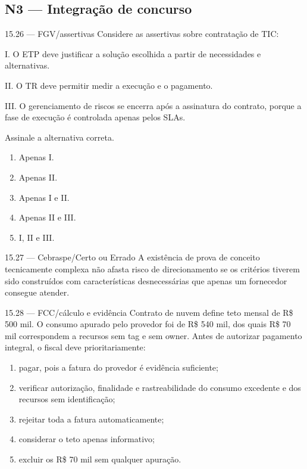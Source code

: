 \subsection*{N3 — Integração de concurso}

\begin{questao}{ 15.26 — FGV/assertivas}
Considere as assertivas sobre contratação de TIC:

I. O ETP deve justificar a solução escolhida a partir de necessidades e alternativas.

II. O TR deve permitir medir a execução e o pagamento.

III. O gerenciamento de riscos se encerra após a assinatura do contrato, porque a fase de execução é controlada apenas pelos SLAs.

Assinale a alternativa correta.
\begin{enumerate}[label=\Alph*)]
\item Apenas I.
\item Apenas II.
\item Apenas I e II.
\item Apenas II e III.
\item I, II e III.
\end{enumerate}
\end{questao}

\begin{questao}{ 15.27 — Cebraspe/Certo ou Errado}
A existência de prova de conceito tecnicamente complexa não afasta risco de direcionamento se os critérios tiverem sido construídos com características desnecessárias que apenas um fornecedor consegue atender.
\end{questao}

\begin{questao}{ 15.28 — FCC/cálculo e evidência}
Contrato de nuvem define teto mensal de R\$ 500 mil. O consumo apurado pelo provedor foi de R\$ 540 mil, dos quais R\$ 70 mil correspondem a recursos sem tag e sem owner. Antes de autorizar pagamento integral, o fiscal deve prioritariamente:
\begin{enumerate}[label=\Alph*)]
\item pagar, pois a fatura do provedor é evidência suficiente;
\item verificar autorização, finalidade e rastreabilidade do consumo excedente e dos recursos sem identificação;
\item rejeitar toda a fatura automaticamente;
\item considerar o teto apenas informativo;
\item excluir os R\$ 70 mil sem qualquer apuração.
\end{enumerate}
\end{questao}

